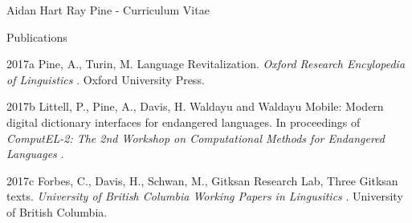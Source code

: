 \documentclass[12pt]{letter}
\begin{document}
\begin{cv}{ Aidan Hart Ray Pine  \space - \space   Curriculum Vitae}
\begin{cvlist}{Publications}
                                                                                                            \item[2017a]  Pine,  A.,  Turin,  M.  Language Revitalization. \textit{ Oxford Research Encylopedia of Linguistics }.  Oxford University Press.  
                                                                                \item[2017b] Littell, P., Pine, A., Davis, H.  Waldayu and Waldayu Mobile: Modern digital dictionary interfaces for endangered languages. In proceedings of \textit{ ComputEL-2: The 2nd Workshop on Computational Methods for Endangered Languages }.  
                                                                                \item[2017c]  Forbes,  C.,  Davis,  H.,  Schwan,  M.,  Gitksan Research Lab,   Three Gitksan texts. \textit{ University of British Columbia Working Papers in Lingusitics }.  University of British Columbia.  
                                                        \end{cvlist}


\end{cv}
\end{document}
